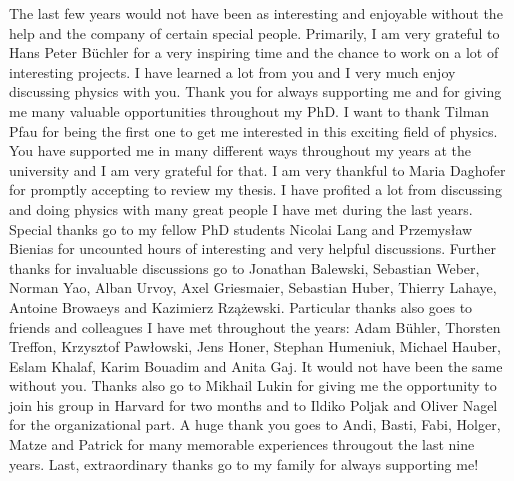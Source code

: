 
The last few years would not have been as interesting and enjoyable without the help and the company of certain special people.
Primarily, I am very grateful to Hans Peter Büchler for a very inspiring time and the chance to work on a lot of interesting projects.
I have learned a lot from you and I very much enjoy discussing physics with you.
Thank you for always supporting me and for giving me many valuable opportunities throughout my PhD.
I want to thank Tilman Pfau for being the first one to get me interested in this exciting field of physics.
You have supported me in many different ways throughout my years at the university and I am very grateful for that.
I am very thankful to Maria Daghofer for promptly accepting to review my thesis.
I have profited a lot from discussing and doing physics with many great people I have met during the last years.
Special thanks go to my fellow PhD students Nicolai Lang and Przemysław Bienias for uncounted hours of interesting and very helpful discussions.
Further thanks for invaluable discussions go to Jonathan Balewski, Sebastian Weber, Norman Yao, Alban Urvoy, Axel Griesmaier, Sebastian Huber, Thierry Lahaye, Antoine Browaeys and Kazimierz Rzążewski.
Particular thanks also goes to friends and colleagues I have met throughout the years: Adam Bühler, Thorsten Treffon, Krzysztof Pawłowski, Jens Honer, Stephan Humeniuk, Michael Hauber, Eslam Khalaf, Karim Bouadim and Anita Gaj.
It would not have been the same without you.
Thanks also go to Mikhail Lukin for giving me the opportunity to join his group in Harvard for two months and to Ildiko Poljak and Oliver Nagel for the organizational part.
A huge thank you goes to Andi, Basti, Fabi, Holger, Matze and Patrick for many memorable experiences througout the last nine years.
Last, extraordinary thanks go to my family for always supporting me!
